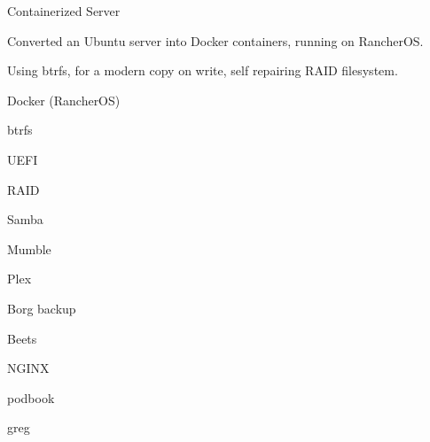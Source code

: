 

\begin{cventries}

  \cventry
    {} %
    {Containerized Server} %
    {} %
    {} %
    {
      \begin{cvitems} %
        \item {Converted an Ubuntu server into Docker containers, running on RancherOS.}
        \item {Using btrfs, for a modern copy on write, self repairing RAID filesystem.}
      \end{cvitems}
    }
    \begin{cventryskills}
      \item Docker (RancherOS)
      \item btrfs
      \item UEFI
      \item RAID
      \item Samba
      \item Mumble
      \item Plex
      \item Borg backup
      \item Beets
      \item NGINX
      \item podbook
      \item greg
    \end{cventryskills}

\end{cventries}

